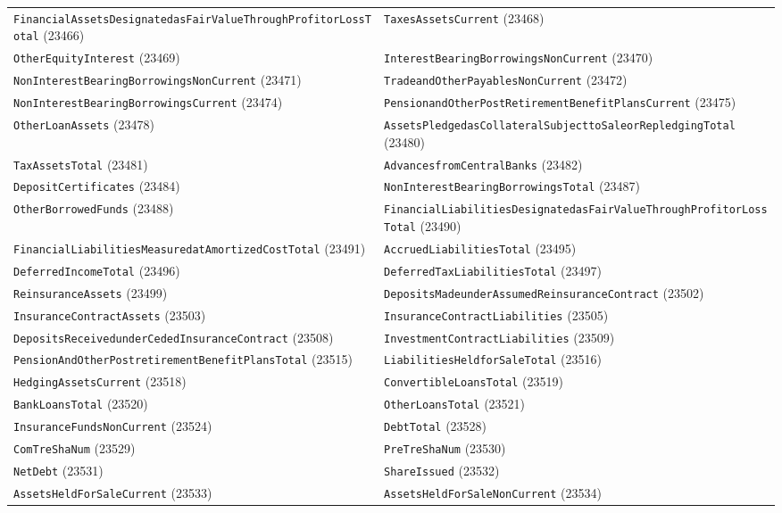 \documentclass[11pt,a4paper]{report}
\begin{document}
\begin{subappendices}
{\begin{longtable}{@{}p{}p{}@{}}
\texttt{FinancialAssetsDesignatedasFairValueThroughProfitorLossTotal} (23466) & \texttt{TaxesAssetsCurrent} (23468) \\
\texttt{OtherEquityInterest} (23469) & \texttt{InterestBearingBorrowingsNonCurrent} (23470) \\
\texttt{NonInterestBearingBorrowingsNonCurrent} (23471) & \texttt{TradeandOtherPayablesNonCurrent} (23472) \\
\texttt{NonInterestBearingBorrowingsCurrent} (23474) & \texttt{PensionandOtherPostRetirementBenefitPlansCurrent} (23475) \\
\texttt{OtherLoanAssets} (23478) & \texttt{AssetsPledgedasCollateralSubjecttoSaleorRepledgingTotal} (23480) \\
\texttt{TaxAssetsTotal} (23481) & \texttt{AdvancesfromCentralBanks} (23482) \\
\texttt{DepositCertificates} (23484) & \texttt{NonInterestBearingBorrowingsTotal} (23487) \\
\texttt{OtherBorrowedFunds} (23488) & \texttt{FinancialLiabilitiesDesignatedasFairValueThroughProfitorLossTotal} (23490) \\
\texttt{FinancialLiabilitiesMeasuredatAmortizedCostTotal} (23491) & \texttt{AccruedLiabilitiesTotal} (23495) \\
\texttt{DeferredIncomeTotal} (23496) & \texttt{DeferredTaxLiabilitiesTotal} (23497) \\
\texttt{ReinsuranceAssets} (23499) & \texttt{DepositsMadeunderAssumedReinsuranceContract} (23502) \\
\texttt{InsuranceContractAssets} (23503) & \texttt{InsuranceContractLiabilities} (23505) \\
\texttt{DepositsReceivedunderCededInsuranceContract} (23508) & \texttt{InvestmentContractLiabilities} (23509) \\
\texttt{PensionAndOtherPostretirementBenefitPlansTotal} (23515) & \texttt{LiabilitiesHeldforSaleTotal} (23516) \\
\texttt{HedgingAssetsCurrent} (23518) & \texttt{ConvertibleLoansTotal} (23519) \\
\texttt{BankLoansTotal} (23520) & \texttt{OtherLoansTotal} (23521) \\
\texttt{InsuranceFundsNonCurrent} (23524) & \texttt{DebtTotal} (23528) \\
\texttt{ComTreShaNum} (23529) & \texttt{PreTreShaNum} (23530) \\
\texttt{NetDebt} (23531) & \texttt{ShareIssued} (23532) \\
\texttt{AssetsHeldForSaleCurrent} (23533) & \texttt{AssetsHeldForSaleNonCurrent} (23534) \\

\end{longtable}}
\end{subappendices}
\end{document}
